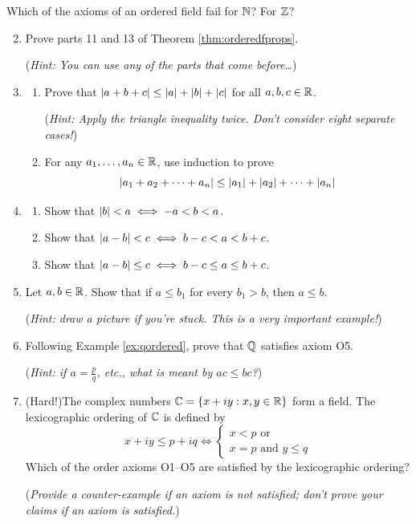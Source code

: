 \begin{exercises}{}{}
	\exstart %
	Which of the axioms of an ordered field fail for $\mathbb{N}$? For $\mathbb{Z}$?
	\begin{enumerate}\setcounter{enumi}{1}
	  \item%
	  Prove parts 11 and 13 of Theorem \ref{thm:orderedfprops}.\par
	  (\emph{Hint: You can use any of the parts that come before\ldots})
	
	
	  \item%
	  \begin{enumerate}
	  	\item Prove that $\left| a+b+c\right|\le \left| a\right|+\left| b\right|+\left| c\right|$ for all $a,b,c\in\mathbb{R}$.\par
	  	(\emph{Hint: Apply the triangle inequality twice. Don't consider eight separate cases!})
	  	\item For any $a_1,\ldots,a_n\in\mathbb{R}$, use induction to prove
	  	\[
	  		\left| a_1+a_2+\cdots+a_n\right|\le\left| a_1\right|+\left| a_2\right|+\cdots+\left| a_n\right|
	  	\]
	  \end{enumerate}
	
	
	  \item%
	  \begin{enumerate}
	  	\item Show that $\left| b\right|<a\iff -a<b<a$.
	  	\item Show that $\left| a-b\right|<c\iff b-c<a<b+c$.
	  	\item Show that $\left| a-b\right|\le c\iff b-c\le a\le b+c$.
	  \end{enumerate}
	
	
	  \item%
	  Let $a,b\in\mathbb{R}$. Show that if $a\le b_1$ for every $b_1>b$, then $a\le b$.\par
	  (\emph{Hint: draw a picture if you're stuck. This is a very important example!})
	  
	  
	  \item Following Example \ref{ex:qordered}, prove that $\mathbb{Q}$ satisfies axiom O5.\par
	  (\emph{Hint: if $a=\frac pq$, etc., what is meant by $ac\le bc$?}) 
	  
	  
	  \item (Hard!)\lstsp The complex numbers $\mathbb{C}=\{x+iy:x,y\in\mathbb{R}\}$ form a field. The lexicographic ordering of $\mathbb{C}$ is defined by
	  \[
	  	x+iy\le p+iq\iff
	  	\begin{cases}
	  		x<p\text{ or}\\
	  		x=p\text{ and }y\le q
	  	\end{cases}
	  \]
	  Which of the order axioms O1--O5 are satisfied by the lexicographic ordering?\par
	  (\emph{Provide a counter-example if an axiom is not satisfied; don't prove your claims if an axiom is satisfied.})
	\end{enumerate}
\end{exercises}


